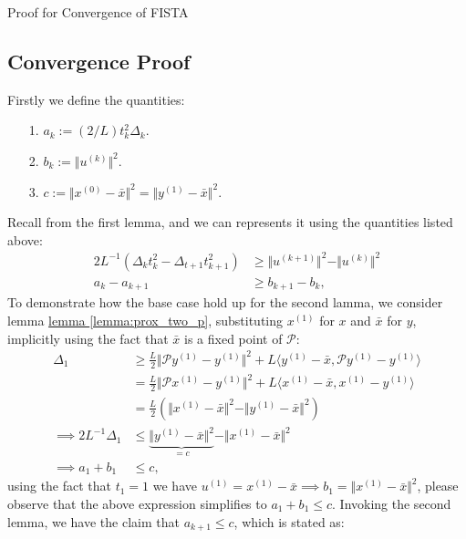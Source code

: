 \documentclass[]{article}
\theoremstyle{definition}
\begin{document}
\begin{section}{Proof for Convergence of FISTA}
    \subsection{Convergence Proof}
        Firstly we define the quantities: 
        \begin{itemize}
            \item [1.] $a_k := (2/L)t_k^2 \Delta_k$.
            \item [2.] $b_k := \Vert u^{(k)}\Vert^2$.
            \item [3.] $c:= \Vert x^{(0)} - \bar x\Vert^2 = \Vert y^{(1)} - \bar x\Vert^2$. 
        \end{itemize}
        Recall from the first lemma, and we can represents it using the quantities listed above: 
        \begin{align*}
            2L^{-1}(\Delta_kt_k^2 - \Delta_{t + 1}t_{k + 1}^2) 
            &\ge 
            \Vert u^{(k + 1)}\Vert^2 - \Vert u^{(k)}\Vert^2
            \\
            a_k - a_{k + 1} &\ge 
            b_{k + 1} - b_k, 
        \end{align*}
        To demonstrate how the base case hold up for the second lamma, we consider lemma \hyperref[lemma:prox_two_p]{lemma \ref*{lemma:prox_two_p}}, substituting $x^{(1)}$ for $x$ and $\bar x$ for $y$, implicitly using the fact that $\bar x$ is a fixed point of $\mathcal P$: 
        \begin{align*}
            \Delta_1& \ge 
            \frac{L}{2}\Vert \mathcal Py^{(1)} - y^{(1)}\Vert^2 + L 
            \langle y^{(1)} - \bar x, \mathcal P y^{(1)} - y^{(1)}\rangle
            \\
            & =
            \frac{L}{2}\Vert \mathcal P x^{(1)} - y^{(1)}\Vert^2 + L 
            \langle x^{(1)} - \bar x, x^{(1)} - y^{(1)}\rangle
            \\
            &= 
            \frac{L}{2}
            (\Vert x^{(1)} - \bar x\Vert^2 - \Vert y^{(1)} - \bar x\Vert^2)
            \\
            \implies
            2L^{-1}\Delta_1 
            &\le
            \underbrace{\Vert y^{(1)} - \bar x\Vert^2}_{=c} - \Vert x^{(1)} - \bar x\Vert^2
            \\
            \implies
            a_1 + b_1
            & \le c, 
        \end{align*}
        using the fact that $t_1 = 1$ we have $u^{(1)} = x^{(1)} - \bar x \implies b_1 = \Vert x^{(1)} - \bar x\Vert^2$, please observe that the above expression simplifies to $a_1 + b_1 \le c$. Invoking the second lemma, we have the claim that $a_{k + 1}\le c$, which is stated as: 

\end{section}
\end{document}
